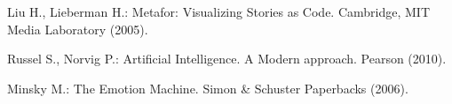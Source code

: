 \documentclass[runningheads,a4paper]{llncs}
\begin{document}
\begin{thebibliography}{4}

Liu H., Lieberman H.:
Metafor: Visualizing Stories as Code.
Cambridge, MIT Media Laboratory  (2005).

Russel S., Norvig P.:
Artificial Intelligence. A Modern approach.
Pearson (2010).

Minsky M.:
The Emotion Machine.
Simon \& Schuster Paperbacks  (2006).

\end{thebibliography}
\end{document}
